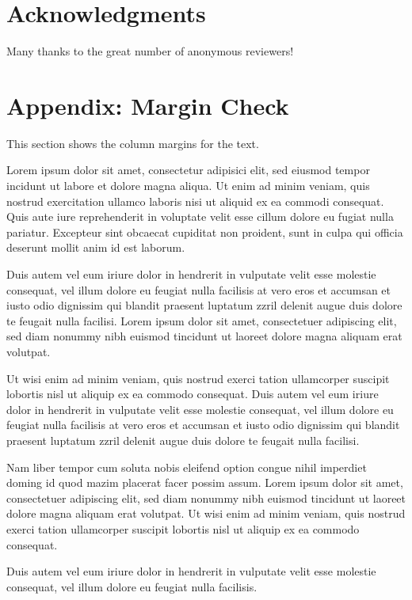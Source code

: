 \documentclass[twoside,a4paper]{article}
\begin{document}
\section{Acknowledgments}
Many thanks to the great number of anonymous reviewers!

\nocite{*}


\section{Appendix: Margin Check}
This section shows the column margins for the text. \bigskip\newline

Lorem ipsum dolor sit amet, consectetur adipisici elit, sed eiusmod tempor incidunt ut labore et dolore magna aliqua. Ut enim ad minim veniam, quis nostrud exercitation ullamco laboris nisi ut aliquid ex ea commodi consequat. Quis aute iure reprehenderit in voluptate velit esse cillum dolore eu fugiat nulla pariatur. Excepteur sint obcaecat cupiditat non proident, sunt in culpa qui officia deserunt mollit anim id est laborum.


Duis autem vel eum iriure dolor in hendrerit in vulputate velit esse molestie consequat, vel illum dolore eu feugiat nulla facilisis at vero eros et accumsan et iusto odio dignissim qui blandit praesent luptatum zzril delenit augue duis dolore te feugait nulla facilisi. Lorem ipsum dolor sit amet, consectetuer adipiscing elit, sed diam nonummy nibh euismod tincidunt ut laoreet dolore magna aliquam erat volutpat.

Ut wisi enim ad minim veniam, quis nostrud exerci tation ullamcorper suscipit lobortis nisl ut aliquip ex ea commodo consequat. Duis autem vel eum iriure dolor in hendrerit in vulputate velit esse molestie consequat, vel illum dolore eu feugiat nulla facilisis at vero eros et accumsan et iusto odio dignissim qui blandit praesent luptatum zzril delenit augue duis dolore te feugait nulla facilisi.

Nam liber tempor cum soluta nobis eleifend option congue nihil imperdiet doming id quod mazim placerat facer possim assum. Lorem ipsum dolor sit amet, consectetuer adipiscing elit, sed diam nonummy nibh euismod tincidunt ut laoreet dolore magna aliquam erat volutpat. Ut wisi enim ad minim veniam, quis nostrud exerci tation ullamcorper suscipit lobortis nisl ut aliquip ex ea commodo consequat.

Duis autem vel eum iriure dolor in hendrerit in vulputate velit esse molestie consequat, vel illum dolore eu feugiat nulla facilisis.
\end{document}
